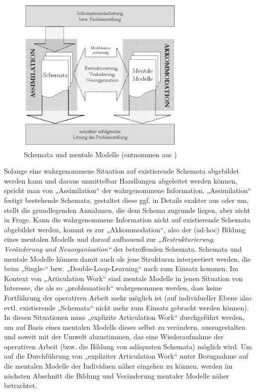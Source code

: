 \begin{figure}[htbp]
	\centering		\includegraphics[height=3in]{img/MentaleModelle/iffenthaler_assimilation_akkommodation.png}
	\caption[Schemata und mentale Modelle]{Schemata und mentale Modelle (entnommen aus \citet[][S. 10]{Ifenthaler06})}
	\label{fig:img_MentaleModelle_iffenthaler_assimilation_akkommodation}
\end{figure}

Solange \wichtig eine wahrgenommene Situation auf existierende Schemata abgebildet werden kann und daraus unmittelbar Handlungen abgeleitet werden können, spricht man von „Assimilation“ der wahrgenommene Information. „Assimilation“ festigt bestehende Schemata, gestaltet diese ggf. in Details exakter aus oder um, stellt die grundlegenden Annahmen, die dem Schema zugrunde liegen, aber nicht in Frage. Kann die wahrgenommene Information nicht auf existierende Schemata abgebildet werden, kommt es zur „Akkommodation“, also der (ad-hoc) Bildung eines mentalen Modells und darauf aufbauend zur \emph{„Restrukturierung, Veränderung und Neuorganisation“} \citep{Ifenthaler06} der betreffenden Schemata. Schemata und mentale Modelle können damit auch als jene Strukturen interpretiert werden, die beim „Single-“ bzw. „Double-Loop-Learning“ nach \citet{Argyris78} zum Einsatz kommen. Im Kontext von „Articulation Work“ sind mentale Modelle in jenen Situation von Interesse, die als so „problematisch“ wahrgenommen werden, dass keine Fortführung der operativen Arbeit mehr möglich ist (auf individueller Ebene also evtl. existierende „Schemata“ nicht mehr zum Einsatz gebracht werden können). In diesen Situationen muss „explizite Articulation Work“ durchgeführt werden, um auf Basis eines mentalen Modells dieses selbst zu verändern, auszugestalten und soweit mit der Umwelt abzustimmen, das eine Wiederaufnahme der operativen Arbeit (bzw. die Bildung von adäquaten Schemata) möglich wird. Um auf die Durchführung von „expliziter Articulation Work“ unter Bezugnahme auf die mentalen Modelle der Individuen näher eingehen zu können, werden im nächsten Abschnitt die Bildung und Veränderung mentaler Modelle näher betrachtet.

